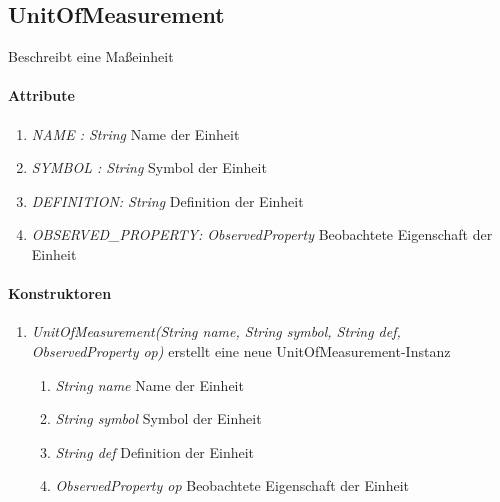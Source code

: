 \subsection{UnitOfMeasurement}
Beschreibt eine Maßeinheit 

\paragraph{Attribute}
\begin{enumerate}[$\bullet$]
	\item \textit{NAME : String} Name der Einheit
	\item \textit{SYMBOL : String} Symbol der Einheit
	\item \textit{DEFINITION: String} Definition der Einheit
	\item \textit{OBSERVED\_PROPERTY: ObservedProperty} Beobachtete Eigenschaft der Einheit
\end{enumerate}

\paragraph{Konstruktoren}
\begin{enumerate}[+]
	\item \textit{ UnitOfMeasurement(String name, String symbol, String def, ObservedProperty op)}
	erstellt eine neue UnitOfMeasurement-Instanz
	\begin{enumerate}[$\bullet$]
		\item \textit{String name} Name der Einheit
		\item \textit{String symbol} Symbol der Einheit
		\item \textit{String def} Definition der Einheit
		\item \textit{ObservedProperty op} Beobachtete Eigenschaft der Einheit
	\end{enumerate}
	
\end{enumerate}
